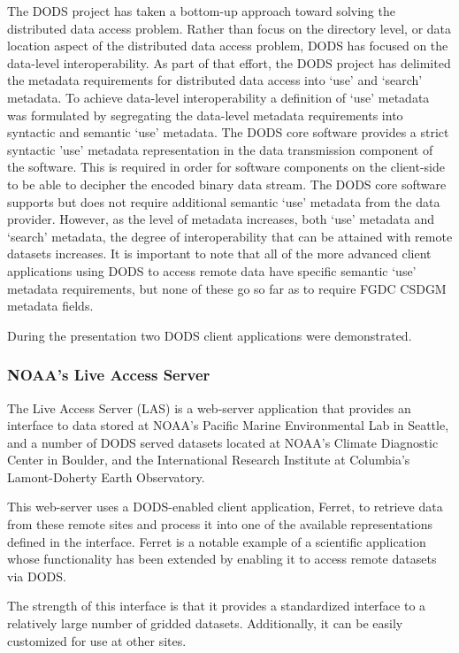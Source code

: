 The DODS project has taken a bottom-up approach toward solving the distributed data access 
problem. Rather than focus on the directory level, or data location aspect of the distributed data 
access problem, DODS has focused on the data-level interoperability. As part of that effort, the 
DODS project has delimited the metadata requirements for distributed data access into `use' and 
`search' metadata. To achieve data-level interoperability a definition of `use' metadata was 
formulated by segregating the data-level metadata requirements into syntactic and semantic `use' 
metadata. The DODS core software provides a strict syntactic 'use' metadata representation in 
the data transmission component of the software. This is required in order for software 
components on the client-side to be able to decipher the encoded binary data stream. The DODS 
core software supports but does not require additional semantic `use' metadata from the data 
provider. However, as the level of metadata increases, both `use' metadata and `search' metadata, 
the degree of interoperability that can be attained with remote datasets increases. It is important 
to note that all of the more advanced client applications using DODS to access remote data have 
specific semantic `use' metadata requirements, but none of these go so far as to require FGDC 
CSDGM metadata fields.

During the presentation two DODS client applications were demonstrated.

\subsubsection{NOAA's Live Access Server}

The Live Access Server (LAS) is a web-server application that provides an interface to data 
stored at NOAA's Pacific Marine Environmental Lab in Seattle, and a number of DODS served 
datasets located at NOAA's Climate Diagnostic Center in Boulder, and the International 
Research Institute at Columbia's Lamont-Doherty Earth Observatory.

This web-server uses a DODS-enabled client application, Ferret, to retrieve data from these 
remote sites and process it into one of the available representations defined in the interface. 
Ferret is a notable example of a scientific application whose functionality has been extended by 
enabling it to access remote datasets via DODS.

The strength of this interface is that it provides a standardized interface to a relatively large 
number of gridded datasets. Additionally, it can be easily customized for use at other sites.

